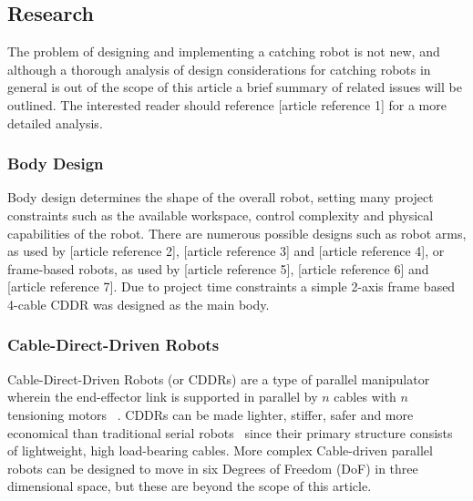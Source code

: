 \documentclass[conference]{IEEEtran}
\begin{document}
	\subsection{Research}\label{research}
	The problem of designing and implementing a catching robot is not new, and although a thorough analysis of design considerations for catching robots in general is out of the scope of this article a brief summary of related issues will be outlined. The interested reader should reference [article reference 1] for a more detailed analysis.
	
	\subsubsection{Body Design}
	Body design determines the shape of the overall robot, setting many project constraints such as the available workspace, control complexity and physical capabilities of the robot. There are numerous possible designs such as robot arms, as used by [article reference 2], [article reference 3] and [article reference 4], or frame-based robots, as used by [article reference 5], [article reference 6] and [article reference 7]. Due to project time constraints a simple 2-axis frame based 4-cable CDDR was designed as the main body.
	
	\subsubsection{Cable-Direct-Driven Robots}
	Cable-Direct-Driven Robots (or CDDRs) are a type of parallel manipulator wherein the end-effector link is supported in parallel by $n$ cables with $n$ tensioning motors ~\cite{CDDR:description}. CDDRs can be made lighter, stiffer, safer and more economical than traditional serial robots~\cite{WilliamsII2003} since their primary structure consists of lightweight, high load-bearing cables. More complex Cable-driven parallel robots can be designed to move in six Degrees of Freedom (DoF) in three dimensional space, but these are beyond the scope of this article. 
	
\end{document}
